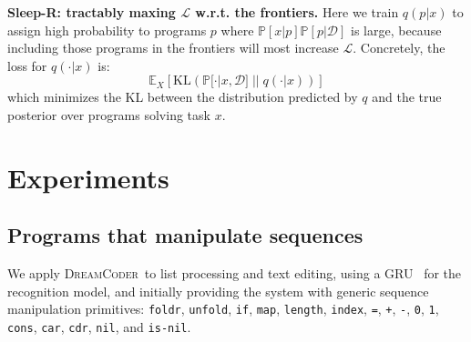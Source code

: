 \documentclass{article}
\newcommand{\system}{\textsc{DreamCoder}~}
\newcommand{\lowerBound}{\mathscr{L}}
\newcommand{\code}[1]{{\footnotesize\texttt{#1}}}
\newcommand{\expect}{\mathds{E}} %
\newcommand{\probability}{\mathds{P}} %
\begin{document}
\textbf{Sleep-R: tractably maxing $\lowerBound$ w.r.t. the
  frontiers.}  Here we train %
$q(p|x)$ to assign high probability to programs $p$ where
$\probability[x|p]\probability[p|\mathcal{D}]$ is large, because including those programs
in the frontiers will most increase $\lowerBound$.
Concretely, the loss for $q(\cdot |x)$ is:
$$
\expect_X\left[ \text{KL}\left(\probability[\cdot |x,\mathcal{D}]\; ||\; q(\cdot |x) \right) \right]
$$
which minimizes the KL between the distribution predicted by $q$ and the true posterior over programs solving task $x$.





\section{Experiments}

\subsection{Programs that manipulate sequences}\label{sequences}
We apply \system to list processing %
and text editing, %
using a GRU~\cite{cho2014learning} for
the recognition model, and initially providing the system with generic sequence manipulation primitives:
\code{foldr}, \code{unfold}, \code{if}, \code{map}, \code{length},
\code{index}, \code{=}, \code{+}, \code{-}, \code{0}, \code{1}, \code{cons},
\code{car}, \code{cdr}, \code{nil}, and \code{is-nil}.
\end{document}
